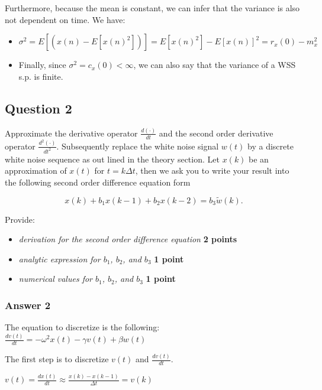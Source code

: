 \documentclass[11pt]{article}
\providecommand{\tightlist}{%
      \setlength{\itemsep}{0pt}\setlength{\parskip}{0pt}}
\begin{document}
Furthermore, because the mean is constant, we can infer that the
variance is also not dependent on time. We have:

\begin{itemize}
\item
  \(\sigma^2 = E[(x(n)-E[x(n)^2])] = E[x(n)^2] - E[x(n)]^2 = r_x(0) - m_x^2\)
\item
  Finally, since \(\sigma^2 = c_x(0) < \infty\), we can also say that
  the variance of a WSS s.p. is finite.
\end{itemize}

    \hypertarget{question-2}{%
\subsection{Question 2}\label{question-2}}

Approximate the derivative operator \(\frac{d(\cdot)}{d t}\) and the
second order derivative operator \(\frac{d^2(\cdot)}{d t^2}\).
Subsequently replace the white noise signal \(w(t)\) by a discrete white
noise sequence as out lined in the theory section. Let \(x(k)\) be an
approximation of \(x(t)\) for \(t = k \Delta t\), then we ask you to
write your result into the following second order difference equation
form

\[ x(k)+ b_1 x(k-1) + b_2 x(k-2) = b_3 \tilde{w}(k).\]

Provide:

\begin{itemize}
\tightlist
\item
  \emph{derivation for the second order difference equation} \textbf{2
  points}
\item
  \emph{analytic expression for \(b_1\), \(b_2\), and \(b_3\)} \textbf{1
  point}
\item
  \emph{numerical values for \(b_1\), \(b_2\), and \(b_3\)} \textbf{1
  point}
\end{itemize}

    \hypertarget{answer-2}{%
\subsubsection{Answer 2}\label{answer-2}}

The equation to discretize is the following:
\(\frac{dv(t)}{dt} = -\omega^2 x(t) - \gamma v(t) + \beta w(t)\)

The first step is to discretize \(v(t)\) and \(\frac{dv(t)}{dt}\).

\(v(t) = \frac{dx(t)}{dt} \approx \frac{x(k) - x(k-1)}{\Delta t} = v(k)\)
\end{document}
